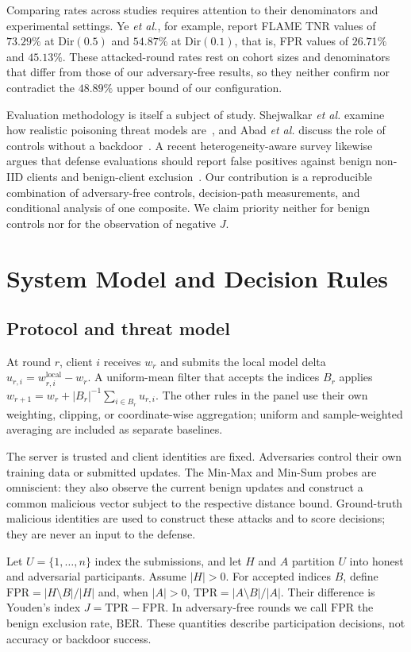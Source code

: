 \documentclass[journal]{IEEEtran}
\newcommand{\BER}{\mathrm{BER}}
\begin{document}
Comparing rates across studies requires attention to their denominators and experimental settings. Ye \emph{et al.}, for example, report FLAME TNR values of $73.29\%$ at $\mathrm{Dir}(0.5)$ and $54.87\%$ at $\mathrm{Dir}(0.1)$, that is, FPR values of $26.71\%$ and $45.13\%$. These attacked-round rates rest on cohort sizes and denominators that differ from those of our adversary-free results, so they neither confirm nor contradict the $48.89\%$ upper bound of our configuration.

Evaluation methodology is itself a subject of study. Shejwalkar \emph{et al.} examine how realistic poisoning threat models are~\cite{shejwalkar2022drawing}, and Abad \emph{et al.} discuss the role of controls without a backdoor~\cite{abad2025evaluation}. A recent heterogeneity-aware survey likewise argues that defense evaluations should report false positives against benign non-IID clients and benign-client exclusion~\cite{djemaa2026heterogeneity}. Our contribution is a reproducible combination of adversary-free controls, decision-path measurements, and conditional analysis of one composite. We claim priority neither for benign controls nor for the observation of negative $J$.

\section{System Model and Decision Rules}\label{sec:model}
\subsection{Protocol and threat model}
At round $r$, client $i$ receives $w_r$ and submits the local model delta $u_{r,i}=w^{\mathrm{local}}_{r,i}-w_r$. A uniform-mean filter that accepts the indices $B_r$ applies $w_{r+1}=w_r+|B_r|^{-1}\sum_{i\in B_r}u_{r,i}$. The other rules in the panel use their own weighting, clipping, or coordinate-wise aggregation; uniform and sample-weighted averaging are included as separate baselines.

The server is trusted and client identities are fixed. Adversaries control their own training data or submitted updates. The Min-Max and Min-Sum probes are omniscient: they also observe the current benign updates and construct a common malicious vector subject to the respective distance bound. Ground-truth malicious identities are used to construct these attacks and to score decisions; they are never an input to the defense.

Let $U=\{1,\ldots,n\}$ index the submissions, and let $H$ and $A$ partition $U$ into honest and adversarial participants. Assume $|H|>0$. For accepted indices $B$, define $\mathrm{FPR}=|H\setminus B|/|H|$ and, when $|A|>0$, $\mathrm{TPR}=|A\setminus B|/|A|$. Their difference is Youden's index $J=\mathrm{TPR}-\mathrm{FPR}$. In adversary-free rounds we call $\mathrm{FPR}$ the benign exclusion rate, $\BER$. These quantities describe participation decisions, not accuracy or backdoor success.
\end{document}
